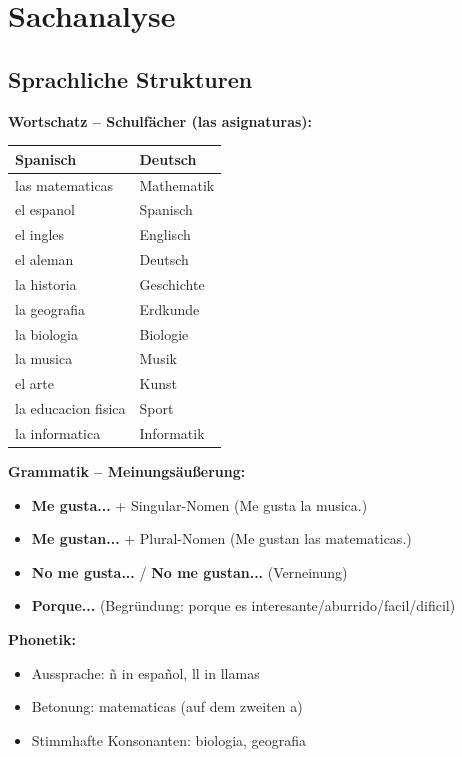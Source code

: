\documentclass[11pt,a4paper]{article}
\begin{document}
\section{Sachanalyse}

\subsection{Sprachliche Strukturen}

\textbf{Wortschatz -- Schulfächer (las asignaturas):}
\begin{center}
\begin{tabular}{|l|l|}
\hline
\textbf{Spanisch} & \textbf{Deutsch} \\
\hline
las matematicas & Mathematik \\
el espanol & Spanisch \\
el ingles & Englisch \\
el aleman & Deutsch \\
la historia & Geschichte \\
la geografia & Erdkunde \\
la biologia & Biologie \\
la musica & Musik \\
el arte & Kunst \\
la educacion fisica & Sport \\
la informatica & Informatik \\
\hline
\end{tabular}
\end{center}

\textbf{Grammatik -- Meinungsäußerung:}
\begin{itemize}
    \item \textbf{Me gusta...} + Singular-Nomen (Me gusta la musica.)
    \item \textbf{Me gustan...} + Plural-Nomen (Me gustan las matematicas.)
    \item \textbf{No me gusta...} / \textbf{No me gustan...} (Verneinung)
    \item \textbf{Porque...} (Begründung: porque es interesante/aburrido/facil/dificil)
\end{itemize}

\textbf{Phonetik:}
\begin{itemize}
    \item Aussprache: ñ in español, ll in llamas
    \item Betonung: matematicas (auf dem zweiten a)
    \item Stimmhafte Konsonanten: biologia, geografia
\end{itemize}
\end{document}
